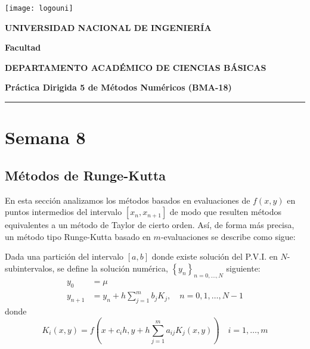 


\providecommand{\faculty}{Facultad}
\noindent\parbox[c]{.18\textwidth}{\texttt{[image: logouni]}}\hfill
\parbox[c]{1\textwidth}{\raggedright%
    {\large\textbf{UNIVERSIDAD NACIONAL DE INGENIERÍA} \par\smallskip}
    {\large\textbf{\faculty} \par\smallskip}
    {\large\textbf{DEPARTAMENTO ACADÉMICO DE CIENCIAS BÁSICAS} \par\smallskip}
}

\begin{center}\bfseries\large
    Práctica Dirigida 5 de Métodos Numéricos (BMA-18)
\end{center}

\vspace{-0.5cm}

\hrulefill
\vspace{-2.5mm}

\rule{16.5cm}{0.8mm}

\section{Semana 8}

\subsection{Métodos de Runge-Kutta}

En esta sección analizamos los métodos basados en evaluaciones de
$f\left(x,y\right)$ en puntos intermedios del intervalo
$\left[x_{n},x_{n+1}\right]$ de modo que resulten métodos
equivalentes a un método de Taylor de cierto orden.
Así, de forma más precisa, un método tipo Runge-Kutta basado en
$m$-evaluaciones se describe como sigue:

Dada una partición del intervalo $\left[a,b\right]$ donde existe
solución del P.V.I. en $N$-subintervalos, se define la solución
numérica, $\left\{y_n\right\}_{n=0,\ldots,N}$ siguiente:
\begin{equation}\label{eq:rungekutta}
    \begin{aligned}
        y_{0}   & =\mu                                                       \\
        y_{n+1} & =y_{n}+h\sum_{j=1}^{m}b_{j}K_{j}, \quad n=0,1, \ldots, N-1
    \end{aligned}
\end{equation}
donde
\begin{equation*}
    K_{i}\left(x,y\right)=
    f\left(x+c_{i}h,y+h\sum_{j=1}^m a_{i j}K_{j}\left(x,y\right)\right) \quad i=1, \ldots, m
\end{equation*}

